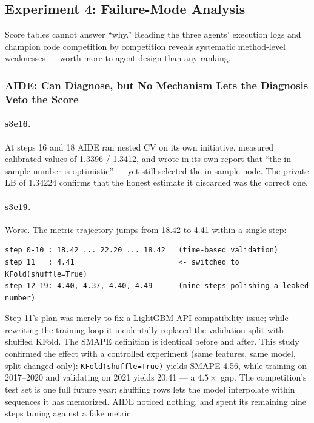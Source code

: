 \documentclass[11pt,a4paper]{article}
\begin{document}
\subsection{Experiment 4: Failure-Mode Analysis}
\label{sec:exp4}

Score tables cannot answer ``why.'' Reading the three agents' execution logs and champion code competition by competition reveals systematic method-level weaknesses --- worth more to agent design than any ranking.

\subsubsection{AIDE: Can Diagnose, but No Mechanism Lets the Diagnosis Veto the Score}

\paragraph{s3e16.} At steps 16 and 18 AIDE ran nested CV on its own initiative, measured calibrated values of 1.3396 / 1.3412, and wrote in its own report that ``the in-sample number is optimistic'' --- yet still selected the in-sample node. The private LB of 1.34224 confirms that the honest estimate it discarded was the correct one.

\paragraph{s3e19.} Worse. The metric trajectory jumps from 18.42 to 4.41 within a single step:

\begin{verbatim}
step 0-10 : 18.42 ... 22.20 ... 18.42   (time-based validation)
step 11   : 4.41                        <- switched to KFold(shuffle=True)
step 12-19: 4.40, 4.37, 4.40, 4.49      (nine steps polishing a leaked number)
\end{verbatim}

Step 11's plan was merely to fix a LightGBM API compatibility issue; while rewriting the training loop it incidentally replaced the validation split with shuffled KFold. The SMAPE definition is identical before and after. This study confirmed the effect with a controlled experiment (same features, same model, split changed only): \texttt{KFold(shuffle=True)} yields SMAPE 4.56, while training on 2017--2020 and validating on 2021 yields 20.41 --- a $4.5\times$ gap. The competition's test set is one full future year; shuffling rows lets the model interpolate within sequences it has memorized. AIDE noticed nothing, and spent its remaining nine steps tuning against a fake metric.
\end{document}

